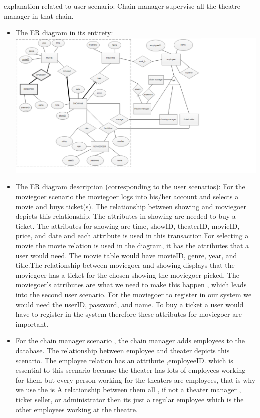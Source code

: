 {\begin{itemize}
explanation related to user scenario: Chain manager supervise all the theatre manager in that chain.
\end{itemize}
\begin{itemize} 
\item{ The ER diagram in its entirety: }
\includegraphics[scale=0.3]{ERmodel.png}
\item{ The ER diagram description (corresponding to the user scenarios): }
For the moviegoer scenario the moviegoer logs into his/her account and selects a movie and buys ticket(s). The relationship between showing and moviegoer depicts this relationship. The attributes in showing are needed to buy a ticket. The attributes for showing are time, showID, theaterID, movieID, price, and date and each attribute is used in this transaction.For selecting a movie the movie relation is used in the diagram, it has the attributes that a user would need. The movie table would have movieID, genre, year, and title.The relationship between moviegoer and showing displays that the moviegoer has a ticket for the chosen showing the moviegoer picked. The moviegoer's attributes are what we need to make this happen , which leads into the second user scenario.
For the moviegoer to register in our system we would need the userID, password, and name. To buy a ticket a user would have to register in the system therefore these attributes for moviegoer are important.
\item{ }
For the chain manager scenario , the chain manager adds employees to the database. The relationship between employee and theater depicts this scenario. The employee relation has an attribute ,employeeID. which is essential to this scenario because the theater has lots of employees working for them but every person working for the theaters are employees, that is why we use the is A relationship between them all , if not a theater manager , ticket seller, or administrator then its just a regular employee which is the other employees working at the theatre.

\end{itemize}}
